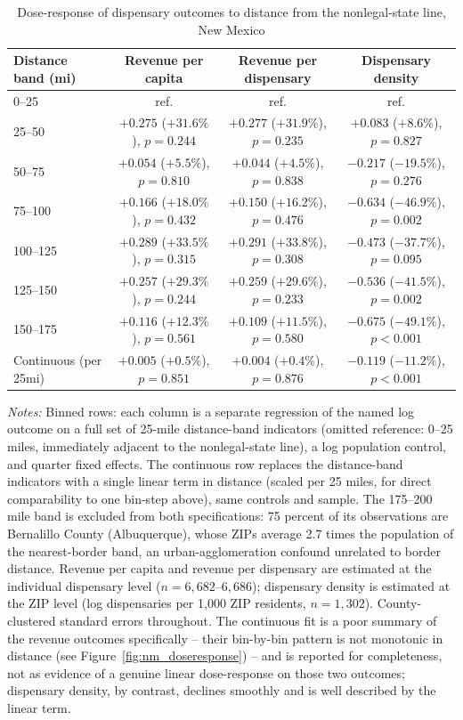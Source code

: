 \begin{table}[htbp]
\centering
\caption{Dose-response of dispensary outcomes to distance from the nonlegal-state line, New Mexico}
\label{tab:nm_doseresponse}
\footnotesize
\begin{tabular}{lccc}
\toprule
Distance band (mi) & Revenue per capita & Revenue per dispensary & Dispensary density \\
\midrule
0--25    & ref. & ref. & ref. \\
25--50   & $+0.275$ ($+31.6\%$), $p=0.244$ & $+0.277$ ($+31.9\%$), $p=0.235$ & $+0.083$ ($+8.6\%$), $p=0.827$ \\
50--75   & $+0.054$ ($+5.5\%$), $p=0.810$  & $+0.044$ ($+4.5\%$), $p=0.838$  & $-0.217$ ($-19.5\%$), $p=0.276$ \\
75--100  & $+0.166$ ($+18.0\%$), $p=0.432$ & $+0.150$ ($+16.2\%$), $p=0.476$ & $-0.634$ ($-46.9\%$), $p=0.002$ \\
100--125 & $+0.289$ ($+33.5\%$), $p=0.315$ & $+0.291$ ($+33.8\%$), $p=0.308$ & $-0.473$ ($-37.7\%$), $p=0.095$ \\
125--150 & $+0.257$ ($+29.3\%$), $p=0.244$ & $+0.259$ ($+29.6\%$), $p=0.233$ & $-0.536$ ($-41.5\%$), $p=0.002$ \\
150--175 & $+0.116$ ($+12.3\%$), $p=0.561$ & $+0.109$ ($+11.5\%$), $p=0.580$ & $-0.675$ ($-49.1\%$), $p<0.001$ \\
\midrule
Continuous (per 25mi) & $+0.005$ ($+0.5\%$), $p=0.851$ & $+0.004$ ($+0.4\%$), $p=0.876$ & $-0.119$ ($-11.2\%$), $p<0.001$ \\
\bottomrule
\end{tabular}
\begin{minipage}{0.98\textwidth}
\vspace{0.3em}
\footnotesize
\textit{Notes:} Binned rows: each column is a separate regression of the named log outcome on a full set of
25-mile distance-band indicators (omitted reference: 0--25 miles, immediately adjacent to the nonlegal-state
line), a log population control, and quarter fixed effects. The continuous row replaces the distance-band
indicators with a single linear term in distance (scaled per 25 miles, for direct comparability to one
bin-step above), same controls and sample. The 175--200 mile band is excluded from both specifications: 75
percent of its observations are Bernalillo County (Albuquerque), whose ZIPs average 2.7 times the population
of the nearest-border band, an urban-agglomeration confound unrelated to border distance. Revenue per capita
and revenue per dispensary are estimated at the individual dispensary level ($n=6{,}682$--$6{,}686$); dispensary
density is estimated at the ZIP level (log dispensaries per 1,000 ZIP residents, $n=1{,}302$). County-clustered
standard errors throughout. The continuous fit is a poor summary of the revenue outcomes specifically -- their
bin-by-bin pattern is not monotonic in distance (see Figure~\ref{fig:nm_doseresponse}) -- and is reported for
completeness, not as evidence of a genuine linear dose-response on those two outcomes; dispensary density, by
contrast, declines smoothly and is well described by the linear term.
\end{minipage}
\end{table}
